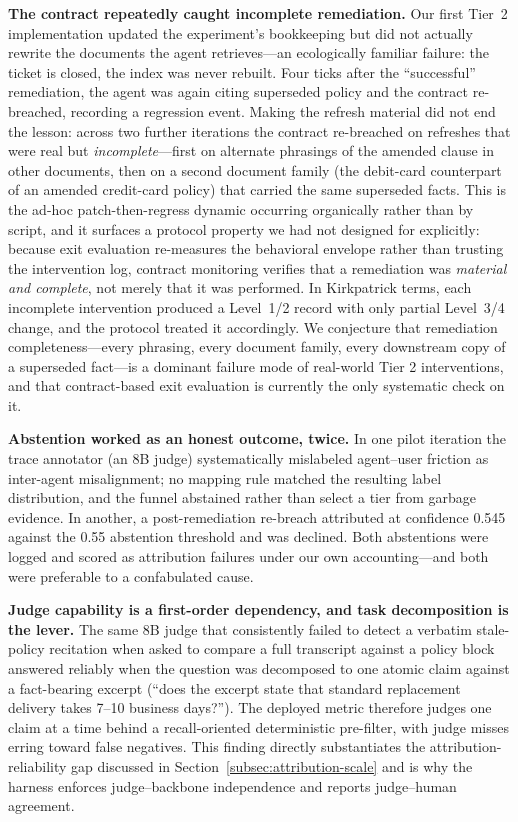 \textbf{The contract repeatedly caught incomplete remediation.} Our first
Tier~2 implementation updated the experiment's bookkeeping but did not
actually rewrite the documents the agent retrieves---an ecologically familiar
failure: the ticket is closed, the index was never rebuilt. Four ticks after
the ``successful'' remediation, the agent was again citing superseded policy
and the contract re-breached, recording a regression event. Making the refresh
material did not end the lesson: across two further iterations the contract
re-breached on refreshes that were real but \emph{incomplete}---first on
alternate phrasings of the amended clause in other documents, then on a second
document family (the debit-card counterpart of an amended credit-card policy)
that carried the same superseded facts. This is the ad-hoc patch-then-regress
dynamic occurring organically rather than by script, and it surfaces a protocol property we had not designed for
explicitly: because exit evaluation re-measures the behavioral envelope rather
than trusting the intervention log, contract monitoring verifies that a
remediation was \emph{material and complete}, not merely that it was
performed. In Kirkpatrick terms, each incomplete intervention produced a
Level~1/2 record with only partial Level~3/4 change, and the protocol treated
it accordingly. We conjecture that remediation completeness---every phrasing,
every document family, every downstream copy of a superseded fact---is a
dominant failure mode of real-world Tier 2 interventions, and that
contract-based exit evaluation is currently the only systematic check on it.

\textbf{Abstention worked as an honest outcome, twice.} In one pilot iteration
the trace annotator (an 8B judge) systematically mislabeled agent--user
friction as inter-agent misalignment; no mapping rule matched the resulting
label distribution, and the funnel abstained rather than select a tier from
garbage evidence. In another, a post-remediation re-breach attributed at
confidence 0.545 against the 0.55 abstention threshold and was declined. Both
abstentions were logged and scored as attribution failures under our own
accounting---and both were preferable to a confabulated cause.

\textbf{Judge capability is a first-order dependency, and task decomposition
is the lever.} The same 8B judge that consistently failed to detect a verbatim
stale-policy recitation when asked to compare a full transcript against a
policy block answered reliably when the question was decomposed to one atomic
claim against a fact-bearing excerpt (``does the excerpt state that standard
replacement delivery takes 7--10 business days?''). The deployed metric
therefore judges one claim at a time behind a recall-oriented deterministic
pre-filter, with judge misses erring toward false negatives. This finding
directly substantiates the attribution-reliability gap discussed in
Section~\ref{subsec:attribution-scale} and is why the harness enforces
judge--backbone independence and reports judge--human agreement.

